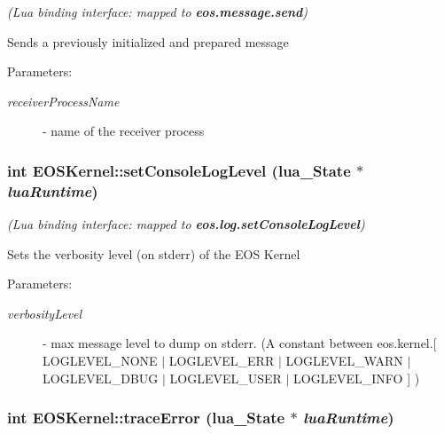 {\em (Lua binding interface: mapped to {\bf eos.message.send})\/}\par
\par
 Sends a previously initialized and prepared message 

\begin{Desc}
\item[Parameters:]
\begin{description}
\item[{\em receiverProcessName}]- name of the receiver process \end{description}
\end{Desc}
\hypertarget{structEOSKernel_32cd671874726365523a0ed8f0d21339}{
\subsubsection[{setConsoleLogLevel}]{\setlength{\rightskip}{0pt plus 5cm}int EOSKernel::setConsoleLogLevel (lua\_\-State $\ast$ {\em luaRuntime})}}
\label{structEOSKernel_32cd671874726365523a0ed8f0d21339}


{\em (Lua binding interface: mapped to {\bf eos.log.setConsoleLogLevel})\/}\par
\par
 Sets the verbosity level (on stderr) of the EOS Kernel 

\begin{Desc}
\item[Parameters:]
\begin{description}
\item[{\em verbosityLevel}]- max message level to dump on stderr. (A constant between eos.kernel.\mbox{[} LOGLEVEL\_\-NONE $|$ LOGLEVEL\_\-ERR $|$ LOGLEVEL\_\-WARN $|$ LOGLEVEL\_\-DBUG $|$ LOGLEVEL\_\-USER $|$ LOGLEVEL\_\-INFO \mbox{]} ) \end{description}
\end{Desc}
\hypertarget{structEOSKernel_9d25589438c403f7b8db9c77bb354a0c}{
\subsubsection[{traceError}]{\setlength{\rightskip}{0pt plus 5cm}int EOSKernel::traceError (lua\_\-State $\ast$ {\em luaRuntime})}}
\label{structEOSKernel_9d25589438c403f7b8db9c77bb354a0c}


